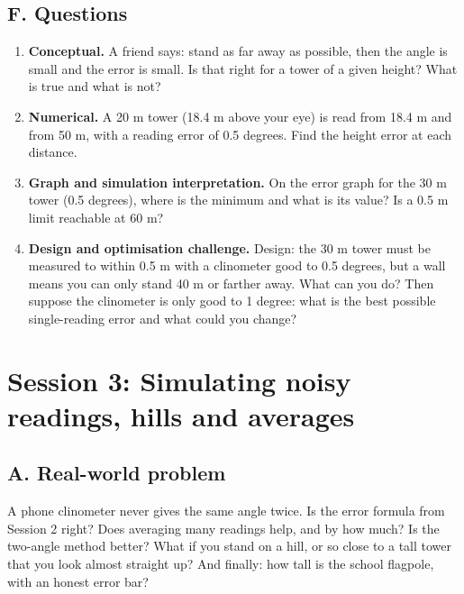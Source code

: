 \documentclass[11pt,a4paper]{article}
\begin{document}
\subsection*{F. Questions}
\begin{enumerate}[nosep]
\item \textbf{Conceptual.} A friend says: stand as far away as possible, then the angle is small and the error is small. Is that right for a tower of a given height? What is true and what is not?
\item \textbf{Numerical.} A 20 m tower (18.4 m above your eye) is read from 18.4 m and from 50 m, with a reading error of 0.5 degrees. Find the height error at each distance.
\item \textbf{Graph and simulation interpretation.} On the error graph for the 30 m tower (0.5 degrees), where is the minimum and what is its value? Is a 0.5 m limit reachable at 60 m?
\item \textbf{Design and optimisation challenge.} Design: the 30 m tower must be measured to within 0.5 m with a clinometer good to 0.5 degrees, but a wall means you can only stand 40 m or farther away. What can you do? Then suppose the clinometer is only good to 1 degree: what is the best possible single-reading error and what could you change?
\end{enumerate}

\section{Session 3: Simulating noisy readings, hills and averages}

\subsection*{A. Real-world problem}
A phone clinometer never gives the same angle twice. Is the error formula from Session 2 right? Does averaging many readings help, and by how much? Is the two-angle method better? What if you stand on a hill, or so close to a tall tower that you look almost straight up? And finally: how tall is the school flagpole, with an honest error bar?
\end{document}
